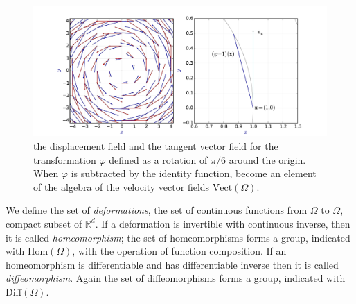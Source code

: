 \begin{figure}[!ht]
	\hspace{-1.5cm}
	\includegraphics[scale=0.6]{figures/se2_circular_vector_field.pdf}
	\caption{the displacement field and the tangent vector field for the transformation $\varphi$ defined as a rotation of $\pi / 6$ around the origin. When $\varphi$ is subtracted by the identity function, become an element of the algebra of the velocity vector fields $\text{Vect}(\Omega)$.}
	\label{fig:se2_circular_vector_field}
\end{figure}

We define the set of \emph{deformations}, the set of continuous functions from $\Omega$ to $\Omega$, compact subset of $\mathbb{R}^d$. If a deformation is invertible with continuous inverse, then it is called \emph{homeomorphism}; the set of homeomorphisms forms a group, indicated with $\text{Hom}(\Omega)$, with the operation of function composition. If an homeomorphism is differentiable and has differentiable inverse then it is called \emph{diffeomorphism}. Again the set of diffeomorphisms forms a group, indicated with $\text{Diff}(\Omega)$.

